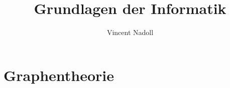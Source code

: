 \documentclass{scrreprt}
\title{Grundlagen der Informatik}
\author{Vincent Nadoll}
\begin{document}
\maketitle
\tableofcontents

\chapter{Graphentheorie}

\end{document}
